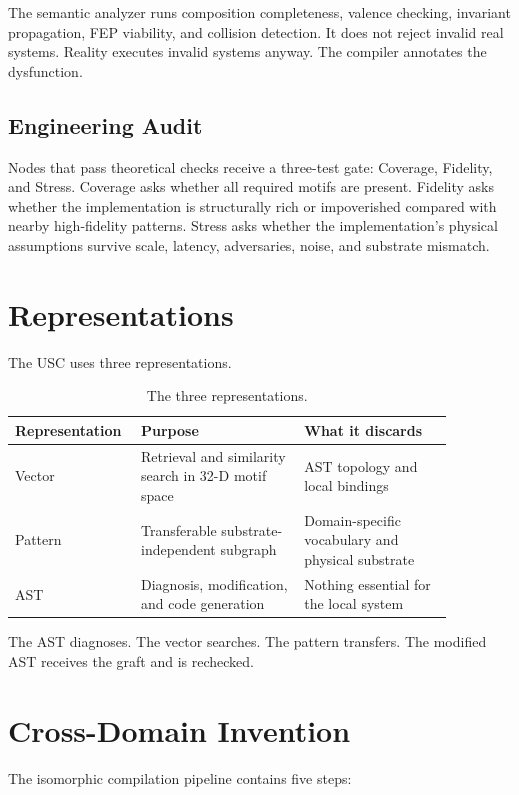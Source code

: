 \documentclass[11pt]{article}
\begin{document}
The semantic analyzer runs composition completeness, valence checking,
invariant propagation, FEP viability, and collision detection. It does not
reject invalid real systems. Reality executes invalid systems anyway. The
compiler annotates the dysfunction.

\subsection{Engineering Audit}

Nodes that pass theoretical checks receive a three-test gate:
Coverage, Fidelity, and Stress. Coverage asks whether all required motifs are
present. Fidelity asks whether the implementation is structurally rich or
impoverished compared with nearby high-fidelity patterns. Stress asks whether
the implementation's physical assumptions survive scale, latency, adversaries,
noise, and substrate mismatch.

\section{Representations}

The USC uses three representations.

\begin{table}[h]
\centering
\caption{The three representations.}
\small
\begin{tabular}{L{0.2\linewidth}L{0.35\linewidth}L{0.32\linewidth}}
\toprule
Representation & Purpose & What it discards \\
\midrule
Vector & Retrieval and similarity search in 32-D motif space & AST topology and local bindings \\
Pattern & Transferable substrate-independent subgraph & Domain-specific vocabulary and physical substrate \\
AST & Diagnosis, modification, and code generation & Nothing essential for the local system \\
\bottomrule
\end{tabular}
\end{table}

The AST diagnoses. The vector searches. The pattern transfers. The modified
AST receives the graft and is rechecked.

\section{Cross-Domain Invention}

The isomorphic compilation pipeline contains five steps:
\end{document}
